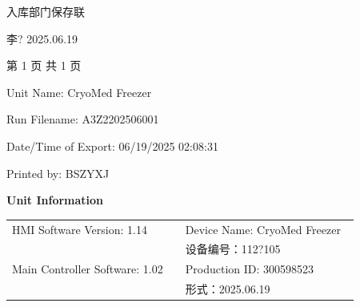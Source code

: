 \documentclass[UTF8,10pt,a4paper,fontset=fandol]{ctexart}
\newcommand{\fieldvalue}[1]{#1}
\newcommand{\handwritten}[1]{#1}
\begin{document}
\vspace{0.2cm}
\begin{flushright}
入库部门保存联
\end{flushright}

\handwritten{李? 2025.06.19}

\begin{center}
第 1 页 共 1 页
\end{center}

\newpage

\noindent
Unit Name:
\fieldvalue{CryoMed Freezer}

\noindent
Run Filename:
\fieldvalue{A3Z2202506001}

\noindent
Date/Time of Export:
\fieldvalue{06/19/2025 02:08:31}

\noindent
Printed by:
\fieldvalue{BSZYXJ}

\medskip
\noindent\textbf{Unit Information}

\noindent
\begin{tabular}{@{}p{0.48\linewidth}p{0.48\linewidth}@{}}
HMI Software Version:
\fieldvalue{1.14}
&
Device Name:
\fieldvalue{CryoMed Freezer}
\\[2pt]
&
\handwritten{设备编号：112?105}
\\[-1pt]
Main Controller Software:
\fieldvalue{1.02}
&
Production ID:
\fieldvalue{300598523}
\\[2pt]
&
\handwritten{形式：2025.06.19}
\end{tabular}

\begin{center}
\end{center}
\end{document}
